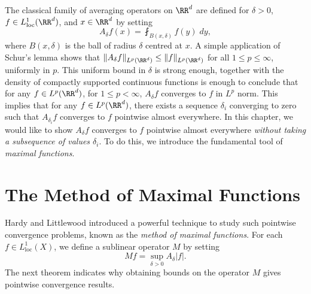 The classical family of averaging operators on $\RR^d$ are defined for $\delta > 0$, $f \in L^1_{\text{loc}}(\RR^d)$, and $x \in \RR^d$ by setting
%
\[ A_\delta f(x) = \fint_{B(x,\delta)} f(y)\; dy, \]
%
where $B(x,\delta)$ is the ball of radius $\delta$ centred at $x$. A simple application of Schur's lemma shows that $\| A_\delta f \|_{L^p(\RR^d)} \leq \| f \|_{L^p(\RR^d)}$ for all $1 \leq p \leq \infty$, uniformly in $p$. This uniform bound in $\delta$ is strong enough, together with the density of compactly supported continuous functions is enough to conclude that for any $f \in L^p(\RR^d)$, for $1 \leq p < \infty$, $A_\delta f$ converges to $f$ in $L^p$ norm. This implies that for any $f \in L^p(\RR^d)$, there exists a sequence $\delta_i$ converging to zero such that $A_{\delta_i} f$ converges to $f$ pointwise almost everywhere. In this chapter, we would like to show $A_\delta f$ converges to $f$ pointwise almost everywhere \emph{without taking a subsequence of values $\delta_i$}. To do this, we introduce the fundamental tool of \emph{maximal functions}.

\section{The Method of Maximal Functions}

Hardy and Littlewood introduced a powerful technique to study such pointwise convergence problems, known as the \emph{method of maximal functions}. For each $f \in L^1_{\text{loc}}(X)$, we define a sublinear operator $M$ by setting
%
\[ Mf = \sup_{\delta > 0} A_\delta |f|. \]
%
The next theorem indicates why obtaining bounds on the operator $M$ gives pointwise convergence results.

